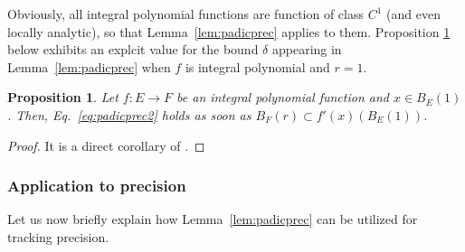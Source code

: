 \documentclass{jT}
\numberwithin{equation}{section}
\newtheorem{prop}[theo]{Proposition}
\theoremstyle{definition}
\begin{document}
Obviously, all integral polynomial functions are function of class $C^1$ 
(and even locally analytic), so that Lemma~\ref{lem:padicprec} applies 
to them. Proposition \ref{prop:padicprec} below exhibits an explcit 
value for the bound $\delta$ appearing in Lemma~\ref{lem:padicprec} when 
$f$ is integral polynomial and $r=1$.

\begin{prop}
\label{prop:padicprec}
Let $f : E \to F$ be an integral polynomial function and $x \in B_E(1)$. 
Then, Eq.~\eqref{eq:padicprec2} holds as soon as 
$B_F(r) \subset f'(x)(B_E(1))$.
\end{prop}

\begin{proof}
It is a direct corollary of \cite[Proposition 3.12]{padicprec}.
\end{proof}

\subsubsection{Application to precision}

Let us now briefly explain how Lemma~\ref{lem:padicprec} can be utilized 
for tracking precision.

\bigskip
\end{document}
